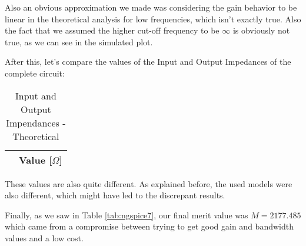 Also an obvious approximation we made was considering the gain behavior to be linear in the theoretical analysis for low frequencies, which isn't exactly true. Also the fact that we assumed the higher cut-off frequency to be $\infty $ is obviously not true, as we can see in the simulated plot.

After this, let's compare the values of the Input and Output Impedances of the complete circuit:

\FloatBarrier
\begin{table}[ht]
	\centering
	\begin{tabular}{|c|c|}
		\hline    
		& {\bf Value [$\Omega$]} \\ \hline
				
	\end{tabular}
	\caption{Input and Output Impendances - Theoretical}
	\label{tab:conc2}
\end{table}
\FloatBarrier

\FloatBarrier
\begin{table}[h]
	\centering
	\qquad
	\caption{Input and Output Impedance - Simulated}
	\label{tab:conc3}
\end{table}
\FloatBarrier

These values are also quite different. As explained before, the used models were also different, which might have led to the discrepant results. 

Finally, as we saw in Table \ref{tab:ngspice7}, our final merit value was $M=2177.485$ which came from a compromise between trying to get good gain and bandwidth values and a low cost.



